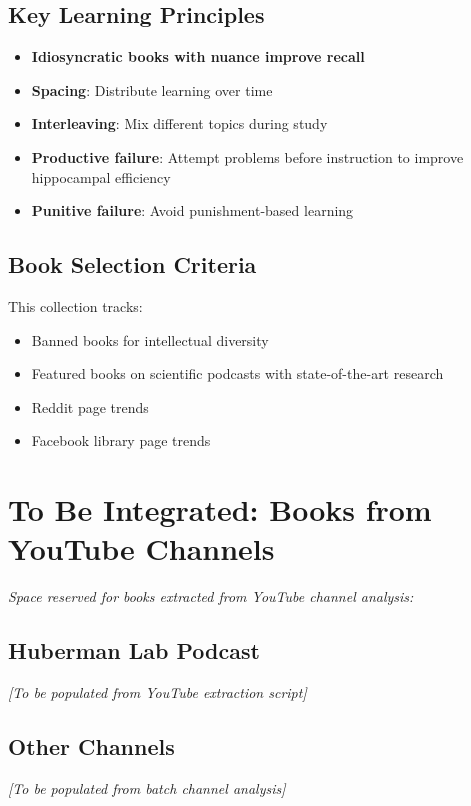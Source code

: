 \documentclass[11pt,a4paper]{article}
\begin{document}
\subsection{Key Learning Principles}
\begin{itemize}
  \item \textbf{Idiosyncratic books with nuance improve recall}
  \item \textbf{Spacing}: Distribute learning over time
  \item \textbf{Interleaving}: Mix different topics during study
  \item \textbf{Productive failure}: Attempt problems before instruction to improve hippocampal efficiency
  \item \textbf{Punitive failure}: Avoid punishment-based learning
\end{itemize}

\subsection{Book Selection Criteria}
This collection tracks:
\begin{itemize}
  \item Banned books for intellectual diversity
  \item Featured books on scientific podcasts with state-of-the-art research
  \item Reddit page trends
  \item Facebook library page trends
\end{itemize}

\section{To Be Integrated: Books from YouTube Channels}

\textit{Space reserved for books extracted from YouTube channel analysis:}

\subsection{Huberman Lab Podcast}
\textit{[To be populated from YouTube extraction script]}

\subsection{Other Channels}
\textit{[To be populated from batch channel analysis]}
\end{document}
